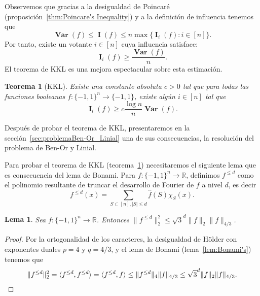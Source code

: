 \documentclass[autocontact]{gaceta}
\newcommand{\R}{\mathbb{R}}
\newtheorem{lemma}{Lema}
\newtheorem{theorem}{Teorema}
\DeclareMathOperator{\Var}{\mathbf{Var}}
\DeclareMathOperator{\II}{\mathbf{I}}
\begin{document}
Observemos que gracias a la desigualdad de Poincaré (proposición~\ref{thm:Poincare's Inequality}) y a la definición de influencia tenemos que
\[
   \Var(f)\leq \II(f)\leq n\max\{\II_i(f): i\in [n]\}.
\]
Por tanto, existe un votante $i\in [n]$ cuya influencia satisface:
\[
   \II_i(f)\geq \frac{\Var(f)}{n}.
\]
El teorema de KKL es una mejora espectacular sobre esta estimación.

\begin{theorem}[KKL]\label{thm:KKL}
Existe una constante absoluta $c >0$ tal que para todas las funciones booleanas $f:\{-1,1\}^n\to \{-1,1\}$, existe algún $i\in [n]$ tal que
\[
\II_i(f)\geq c \frac{\log n}{n} \Var(f).
\]
\end{theorem}

Después de probar el teorema de KKL, presentaremos en la sección~\ref{sec:problemaBen-Or_Linial} una de sus consecuencias, la resolución del problema de Ben-Or y Linial.

Para probar el teorema de KKL (teorema~\ref{thm:KKL}) necesitaremos el siguiente lema que es consecuencia del lema de Bonami. Para $f: \{-1,1\}^n\to\R$, definimos $f^{\leq d}$ como el polinomio resultante de truncar el desarrollo de Fourier de $f$ a nivel $d$, es decir
\[
f^{\leq d}(x) = \sum_{S\subset [n], |S|\leq d} \widehat{f}(S) \chi_S(x).
\]

\begin{lemma} \label{lem:auxiliary}
Sea $f: \{-1,1\}^n\to\R$. Entonces $\|f^{\leq d}\|_2^2\leq \sqrt{3}^d \|f\|_2\|f\|_{4/3}$.
\end{lemma}

\begin{proof} Por la ortogonalidad de los caracteres, la desigualdad de Hölder con exponentes duales $p=4$ y $q=4/3$, y el lema de Bonami (lema~\ref{lem:Bonami's}) tenemos que
\[
   \|f^{\leq d}\|_2^2
   = \langle f^{\leq d},f^{\leq d}\rangle
   = \langle f^{\leq d},f\rangle
   \leq \|f^{\leq d}\|_4\|f\|_{4/3}
   \leq \sqrt{3}^d \|f\|_2\|f\|_{4/3}.
   \qedhere
\]
\end{proof}
\end{document}
